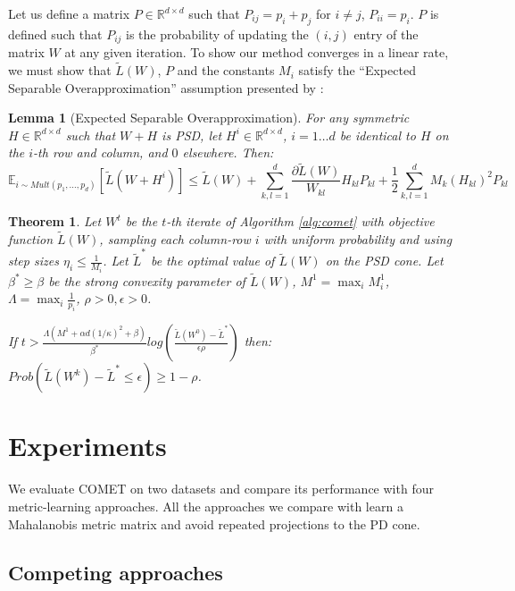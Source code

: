 \documentclass{article} %
\newcommand\mat[1]{{#1}}
\newcommand{\W}{\mat{W}}
\newcommand{\Hh}{\mat{H}}
\newcommand{\Pp}{\mat{P}}
\newcommand{\R}{\mathbb{R}}
\newcommand{\tL}{\tilde{L}(\W)}
\newcommand{\grdkl}{\frac{\partial \tL}{\W_{kl}}}
\newtheorem{theorem}{Theorem}
\newtheorem{lemma}{Lemma}
\begin{document}
Let us define a matrix $\Pp \in \R^{d \times d}$ such that $\Pp_{ij} = p_i + p_j$ for $i \ne j$, $\Pp_{ii} = p_i$. $\Pp$ is defined such that $\Pp_{ij}$ is the probability of updating the $(i,j)$ entry of the matrix $\W$ at any given iteration. To show our method converges in a linear rate, we must show that $\tL$, $\Pp$ and the constants $M_i$ satisfy the ``Expected Separable Overapproximation'' assumption presented by \citet{richtarik2013optimal}:

\begin{lemma}[Expected Separable Overapproximation]\label{lem:ESO}
For any symmetric $\Hh \in \R^{d \times d}$ such that $\W + \Hh$ is PSD, let $\Hh^i \in \R^{d \times d}$, $i=1 \ldots d$ be identical to $\Hh$ on the $i$-th row and column, and $0$ elsewhere. Then:
\begin{equation}
\mathbb{E}_{i \sim Mult(p_1, \ldots, p_d)} \left[ \tilde{L}(\W + \Hh^i) \right] \leq 
\tL + \sum_{k,l=1}^d  \grdkl \Hh_{kl} \Pp_{kl} + \frac{1}{2} \sum_{k,l=1}^d   M_k (\Hh_{kl})^2 \Pp_{kl}
\end{equation}

\end{lemma}



\begin{theorem}
Let $\W^t$ be the $t$-th iterate of Algorithm \ref{alg:comet} with objective function $\tL$, sampling each column-row $i$ with uniform probability and using step sizes $\eta_i \leq \frac{1}{M_i}$. Let $\tilde{L}^*$ be the optimal value of $\tL$ on the PSD cone. Let $\beta^* \geq \beta$ be the strong convexity parameter of $\tL$, $M^1 = \max_i M^1_i$, $\Lambda = \max_i \frac{1}{p_i}$, $\rho >0, \epsilon>0$.

If $t > \frac{\Lambda (M^1 + \alpha d (1/\kappa)^2 + \beta)}{\beta^*} log \left( \frac{\tilde{L}(W^0) - \tilde{L}^*}{\epsilon \rho}\right)$ then: $Prob(\tilde{L}(\W^k) - \tilde{L}^* \leq \epsilon) \geq 1-\rho$.
\end{theorem}


\section{Experiments}
We evaluate COMET on two datasets and compare its performance with four metric-learning approaches. All the approaches we compare with learn a Mahalanobis metric matrix and avoid repeated projections to the PD cone. 


\subsection{Competing approaches}
\end{document}
